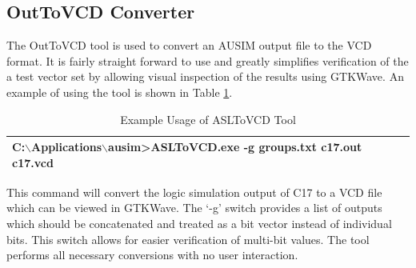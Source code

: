 \documentclass[12pt]{report}
\begin{document}
\subsection{OutToVCD Converter}
The OutToVCD tool is used to convert an AUSIM output file to the VCD format.  It is fairly straight forward to use and greatly simplifies verification of the a test vector set by allowing visual inspection of the results using GTKWave.   An example of using the tool is shown in Table \ref{tbl:outtovcd_example}.
\begin{table}
  \begin{center}
    \caption{Example Usage of ASLToVCD Tool}
    \begin{tabular}{|l|}
      \hline
        C:$\backslash$Applications$\backslash$ausim\textgreater ASLToVCD.exe -g groups.txt c17.out c17.vcd \\
      \hline
    \end{tabular}
    \label{tbl:outtovcd_example}
  \end{center}
\end{table}
This command will convert the logic simulation output of C17 to a VCD file which can be viewed in GTKWave.  The `-g' switch provides a list of outputs which should be concatenated and treated as a bit vector instead of individual bits.  This switch allows for easier verification of multi-bit values.  The tool performs all necessary conversions with no user interaction.
\end{document}
